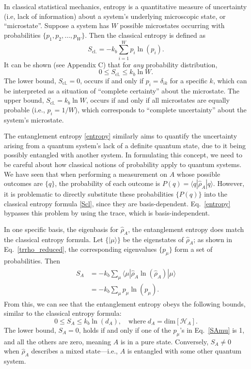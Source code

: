 \documentclass[prx,12pt]{revtex4-2}
\begin{document}
In classical statistical mechanics, entropy is a quantitative measure
of uncertainty (i.e, lack of information) about a system's underlying
microscopic state, or ``microstate''.  Suppose a system has $W$
possible microstates occurring with probabilities $\{p_1, p_2, \dots,
p_W\}$.  Then the classical entropy is defined as
\begin{equation}
  S_{\mathrm{cl.}} = - k_b \sum_{i=1}^W p_i \ln(p_i).
  \label{Scl}
\end{equation}
It can be shown (see Appendix C) that for \textit{any} probability
distribution,
\begin{equation}
  0 \le S_{\mathrm{cl.}} \le k_b\ln W.
\end{equation}
The lower bound, $S_{\mathrm{cl.}} = 0$, occurs if and only if $p_i =
\delta_{ik}$ for a specific $k$, which can be interpreted as a
situation of ``complete certainty'' about the microstate.  The upper
bound, $S_{\mathrm{cl.}} = k_b\ln W$, occurs if and only if all
microstates are equally probable (i.e., $p_i = 1/W$), which
corresponds to ``complete uncertainty'' about the system's microstate.

The entanglement entropy \eqref{entropy} similarly aims to quantify
the uncertainty arising from a quantum system's lack of a definite
quantum state, due to it being possibly entangled with another system.
In formulating this concept, we need to be careful about how classical
notions of probability apply to quantum systems.  We have seen that
when performing a measurement on $A$ whose possible outcomes are
$\{q\}$, the probability of each outcome is $P(q) = \langle q |
\hat{\rho}_A|q\rangle$.  However, it is problematic to directly
substitute these probabilities $\{P(q)\}$ into the classical entropy
formula \eqref{Scl}, since they are basis-dependent.
Eq.~\eqref{entropy} bypasses this problem by using the trace, which is
basis-independent.

In one specific basis, the eigenbasis for $\hat{\rho}_A$, the
entanglement entropy does match the classical entropy formula.  Let
$\{|\mu\rangle\}$ be the eigenstates of $\hat{\rho}_A$; as shown in
Eq.~\eqref{trrho_reduced}, the corresponding eigenvalues $\{p_\mu\}$
form a set of probabilities.  Then
\begin{align}
  \begin{aligned}
    S_A &= -k_b \sum_\mu \langle \mu | \hat{\rho}_A \ln(\hat{\rho}_A) | \mu\rangle  \\
    &= - k_b \sum_\mu p_\mu \ln(p_\mu).
    \label{SAmu}
  \end{aligned}
\end{align}
From this, we can see that the entanglement entropy obeys the
following bounds, similar to the classical entropy formula:
\begin{equation}
  0 \le S_A \le k_b\ln(d_A), \quad
  \mathrm{where}\; d_A = \mathrm{dim}\left[\mathscr{H}_A\right].
  \label{Sabounds}
\end{equation}
The lower bound, $S_A = 0$, holds if and only if one of the $p_\mu$'s
in Eq.~\eqref{SAmu} is 1, and all the others are zero, meaning $A$ is
in a pure state.  Conversely, $S_{A} \ne 0$ when $\hat{\rho}_A$
describes a mixed state---i.e., $A$ is entangled with some other
quantum system.
\end{document}
